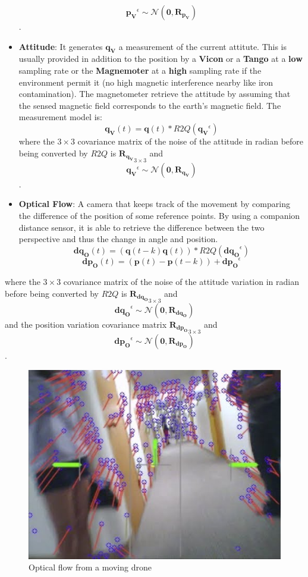 \documentclass[12pt,]{article}
\begin{document}
\begin{itemize}
  \[\mathbf{p_V}^\epsilon \sim \mathcal{N}(\mathbf{0}, \mathbf{R}_{\mathbf{p_V}})\].
\item
  \textbf{Attitude}: It generates \(\mathbf{q_V}\) a measurement of the
  current attitute. This is usually provided in addition to the position
  by a \textbf{Vicon} or a \textbf{Tango} at a \textbf{low} sampling
  rate or the \textbf{Magnemoter} at a \textbf{high} sampling rate if
  the environment permit it (no high magnetic interference nearby like
  iron contamination). The magnetometer retrieve the attitude by
  assuming that the sensed magnetic field corresponds to the earth's
  magnetic field. The measurement model is:
  \[\mathbf{q_V}(t) = \mathbf{q}(t)*R2Q(\mathbf{q_V}^\epsilon)\] where
  the \(3 \times 3\) covariance matrix of the noise of the attitude in
  radian before being converted by \(R2Q\) is
  \({\mathbf{R}_{\mathbf{q_V}}}_{3 \times 3}\) and
  \[\mathbf{q_V}^\epsilon \sim \mathcal{N}(\mathbf{0}, \mathbf{R}_{\mathbf{q_V}})\].
\item
  \textbf{Optical Flow}: A camera that keeps track of the movement by
  comparing the difference of the position of some reference points. By
  using a companion distance sensor, it is able to retrieve the
  difference between the two perspective and thus the change in angle
  and position.
  \[\mathbf{dq_O}(t) = (\mathbf{q}(t-k)\mathbf{q}(t))*R2Q(\mathbf{dq_O}^\epsilon)\]
  \[\mathbf{dp_O}(t) = (\mathbf{p}(t) - \mathbf{p}(t-k)) + \mathbf{dp_O}^\epsilon\]
\end{itemize}

where the \(3 \times 3\) covariance matrix of the noise of the attitude
variation in radian before being converted by \(R2Q\) is
\({\mathbf{R}_{\mathbf{dq_O}}}_{3 \times 3}\) and
\[\mathbf{dq_O}^\epsilon \sim \mathcal{N}(\mathbf{0}, \mathbf{R}_{\mathbf{dq_O}})\]
and the position variation covariance matrix
\({\mathbf{R}_{\mathbf{dp_O}}}_{3 \times 3}\) and
\[\mathbf{dp_O}^\epsilon \sim \mathcal{N}(\mathbf{0}, \mathbf{R}_{\mathbf{dp_O}})\].

\begin{figure}
\centering
\includegraphics{opflow.jpg}
\caption{Optical flow from a moving drone}
\end{figure}
\end{document}
